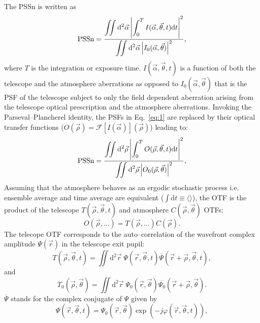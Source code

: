 \documentclass{gmto}
\begin{document}
The $\mathrm{PSSn}$ is written as
\begin{equation}
  \label{eq:1}
\mathrm{PSSn} = {\displaystyle\iint {\mathrm d}^2\vec\alpha \left| \int_0^T I(\vec\alpha,\vec \theta, t){\mathrm d}t \right|^2 \over \displaystyle\iint {\mathrm d}^2\vec\alpha \left| I_0(\vec\alpha,\vec \theta) \right|^2},
\end{equation}
where $T$ is the
integration or exposure time.
$I(\vec\alpha,\vec \theta, t)$ is a function of both the telescope and the atmosphere aberrations
as opposed to $I_0(\vec\alpha,\vec \theta)$ that is the PSF of the telescope subject to
only the field dependent aberration arising from the telescope optical
prescription and the atmosphere aberrations.
Invoking the Parseval--Plancherel identity, the PSFs in Eq.~\eqref{eq:1} are
replaced by their optical transfer functions ($O(\vec\rho) =
\mathcal F\left[ I\left( \vec\alpha \right) \right]\left( \vec\rho\right)$)
leading to:
\begin{equation}
  \label{eq:2}
\mathrm{PSSn} = {\displaystyle\iint {\mathrm d}^2\vec\rho \left| \int_0^T O(\vec\rho,\vec \theta, t){\mathrm d}t \right|^2 \over \displaystyle\iint {\mathrm d}^2\vec\rho \left| O_0(\vec\rho,\vec \theta) \right|^2},
\end{equation}
Assuming that the atmosphere behaves as an ergodic stochastic process i.e.
ensemble average and time average are equivalent ($\int
\mathrm{d}t \equiv \langle  \rangle$), the OTF is the product of the
telescope $T(\vec\rho,\vec \theta,t)$ and atmosphere $C(\vec\rho,\vec \theta)$ OTFs: 
\begin{equation}
  \label{eq:3}
  O(\vec\rho, \dots)= T(\vec\rho, \dots) C(\vec\rho).
\end{equation}
The telecope OTF corresponds to the auto--correlation of the wavefront complex amplitude
$\Psi\left( \vec r \right)$
in the telescope exit pupil:
\begin{equation}
  \label{eq:4}
  {T}\left( \vec\rho,\vec \theta, t \right) = \iint {\mathrm{d}^2\vec r}\; \Psi\left( \vec r,\vec \theta, t \right)\overline{\Psi}\left( \vec r + \vec\rho,\vec \theta, t \right),
\end{equation}
and
\begin{equation}
  \label{eq:5}
  {T_0}\left( \vec\rho,\vec\theta \right) = \iint {\mathrm{d}^2\vec r}\; \Psi_0\left( \vec r,\vec\theta \right)\overline{\Psi_0}\left( \vec r + \vec\rho,\vec\theta \right).
\end{equation}
$\overline{\Psi}$ stands for the complex conjugate of $\Psi$ given by
\begin{equation}
  \label{eq:6}
  \Psi\left( \vec r,\vec \theta, t \right) = \Psi_0\left( \vec r,\vec \theta \right) \exp\left( -j\varphi\left( \vec r,\vec \theta, t \right)  \right),
\end{equation}
\end{document}
